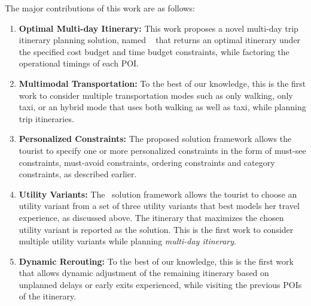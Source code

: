 The major contributions of this work are as follows:
%
\begin{enumerate}
\item \textbf{Optimal Multi-day Itinerary:} This work proposes a novel multi-day trip itinerary planning solution, named \trip~ that returns an optimal itinerary under the specified cost budget and time budget constraints, while factoring the operational timings of each POI.  
\item \textbf{Multimodal Transportation:} To the best of our knowledge, this is the first work to consider multiple transportation modes such as only walking, only taxi, or an hybrid mode that uses both walking as well as taxi, while planning trip itineraries.
\item \textbf{Personalized Constraints:} The proposed solution framework allows the tourist to specify one or more personalized constraints in the form of must-see constraints, must-avoid constraints, ordering constraints and category constraints, as described earlier.
\item \textbf{Utility Variants:} The \trip~solution framework allows the tourist to choose an utility variant from a set of three utility variants that best models her travel experience, as discussed above. The itinerary that maximizes the chosen utility variant is reported as the solution. This is the first work to consider multiple utility variants while planning \emph{multi-day itinerary}.
\item \textbf{Dynamic Rerouting:} To the best of our knowledge, this is the first work that allows dynamic adjustment of the remaining itinerary based on unplanned delays or early exits experienced, while visiting the previous POIs of the itinerary.
%
\end{enumerate}

